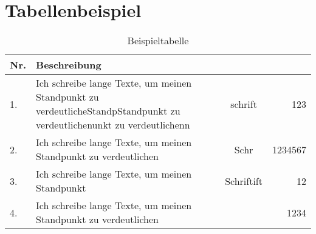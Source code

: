 \section{Tabellenbeispiel}
\begin{table}[h]
    \begin{tabularx}{\textwidth}{|l|X|c|r|}
        \hline
        \textbf{Nr.} & \textbf{Beschreibung} & &\\
        \hline
        1. & Ich schreibe lange Texte, um meinen Standpunkt 
        zu verdeutlicheStandpStandpunkt zu verdeutlichenunkt 
        zu verdeutlichenn  & schrift  &  123 \\
        \hline
        2. & Ich schreibe lange Texte, um meinen Standpunkt 
        zu verdeutlichen  & Schr  &   1234567 \\
        \hline
        3. & Ich schreibe lange Texte, um meinen Standpunkt
        & Schriftift  &   12 \\
        \hline
        4. & Ich schreibe lange Texte, um meinen Standpunkt 
        zu verdeutlichen  &   &   1234 \\
        \hline
    \end{tabularx}
    \caption{Beispieltabelle}
\label{tab:Beispieltabelle}
\end{table}
    